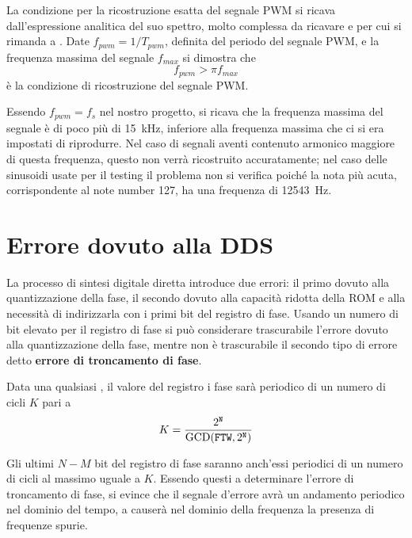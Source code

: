 La condizione per la ricostruzione esatta del segnale PWM si ricava
dall'espressione analitica del suo spettro, molto complessa da ricavare e per
cui si rimanda a \cite{pwmspectrum}.
Date $f_{pwm}=1/T_{pwm}$, definita del periodo del segnale PWM, e la frequenza
 massima del segnale $f_{max}$ si dimostra che
\begin{equation}
f_{pwm} > \pi f_{max}
\end{equation}
è la condizione di ricostruzione del segnale PWM.

Essendo $f_{pwm}=f_s$ nel nostro progetto, si ricava che la frequenza massima del segnale
è di poco più di \SI{15}{\kilo\hertz}, inferiore alla frequenza massima
che ci si era impostati di riprodurre.
Nel caso di segnali aventi contenuto armonico maggiore di questa frequenza,
questo non verrà ricostruito accuratamente; nel caso delle sinusoidi usate
per il testing il problema non si verifica poiché la nota più acuta,
corrispondente al note number 127, ha una frequenza di \SI{12543}{\hertz}.

\section{Errore dovuto alla DDS}
La processo di sintesi digitale diretta introduce due errori: il primo dovuto
alla quantizzazione della fase, il secondo dovuto alla capacità ridotta della
ROM e alla necessità di indirizzarla con i primi  bit del registro
di fase.
Usando un numero  di bit elevato per il registro di fase si può
considerare trascurabile l'errore dovuto alla quantizzazione della fase,
mentre non è trascurabile il secondo tipo di errore detto \textbf{errore
di troncamento di fase}.

Data una qualsiasi , il valore del registro i fase sarà periodico
di un numero di cicli $K$ pari a\cite{analogdevicessec4}
\[
  K = \frac{2^{\texttt{N}}}{\textrm{GCD}(\texttt{FTW}, 2^{\texttt{N}})}
\]

Gli ultimi $N-M$ bit del registro di fase saranno anch'essi periodici di un numero
di cicli al massimo uguale a $K$. Essendo questi a determinare l'errore di troncamento
di fase, si evince che il segnale d'errore avrà un andamento periodico 
nel dominio del tempo, a causerà nel dominio della frequenza la presenza
di frequenze spurie.

